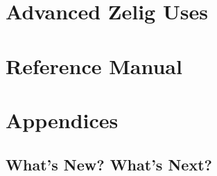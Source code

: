 \part{Advanced Zelig Uses}






\part{Reference Manual}



\appendix

\part[Appendices]{Appendices}

%

\chapter{What's New?  What's Next?}










